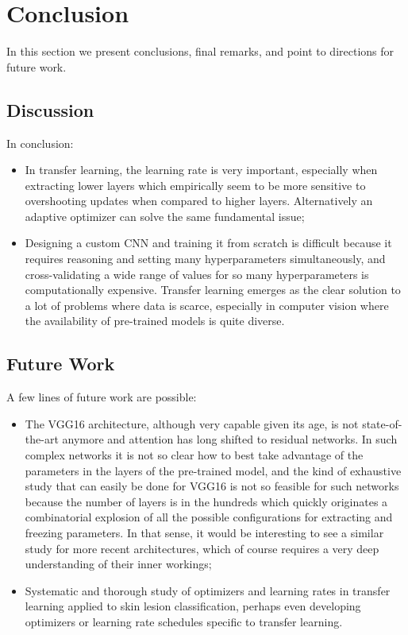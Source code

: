 \chapter{Conclusion}
\label{chapter:conclusion}

In this section we present conclusions, final remarks, and point to directions for future work.

\section{Discussion}

In conclusion:

\begin{itemize}
    \item In transfer learning, the learning rate is very important, especially when extracting lower layers which empirically seem to be more sensitive to overshooting updates when compared to higher layers. Alternatively an adaptive optimizer can solve the same fundamental issue;
    \item Designing a custom \ac{CNN} and training it from scratch is difficult because it requires reasoning and setting many hyperparameters simultaneously, and cross-validating a wide range of values for so many hyperparameters is computationally expensive. Transfer learning emerges as the clear solution to a lot of problems where data is scarce, especially in computer vision where the availability of pre-trained models is quite diverse.
\end{itemize}

\section{Future Work}

A few lines of future work are possible:

\begin{itemize}
    \item The VGG16 architecture, although very capable given its age, is not state-of-the-art anymore and attention has long shifted to residual networks. In such complex networks it is not so clear how to best take advantage of the parameters in the layers of the pre-trained model, and the kind of exhaustive study that can easily be done for VGG16 is not so feasible for such networks because the number of layers is in the hundreds which quickly originates a combinatorial explosion of all the possible configurations for extracting and freezing parameters. In that sense, it would be interesting to see a similar study for more recent architectures, which of course requires a very deep understanding of their inner workings;
    \item Systematic and thorough study of optimizers and learning rates in transfer learning applied to skin lesion classification, perhaps even developing optimizers or learning rate schedules specific to transfer learning.
\end{itemize}
